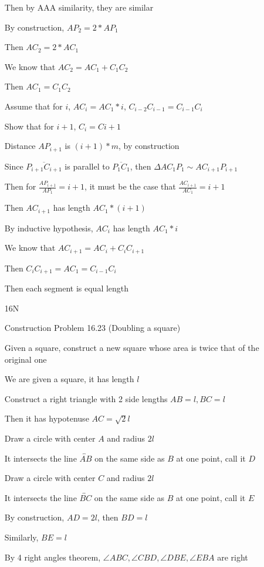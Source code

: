 \documentclass[11pt]{article}
\newcommand{\lines}[1]{\overleftrightarrow{#1}}
\newcommand{\segment}[1]{\overline{#1}}
\begin{document}
\begin{itemize}
		Then by AAA similarity, they are similar
			
		By construction, $AP_2 = 2*AP_1$

		Then $AC_2 = 2 * AC_1$

		We know that $AC_2 = AC_1 + C_1C_2$

		Then $AC_1 = C_1C_2$

		Assume that for $i$, $AC_i = AC_1 * i$,  $C_{i-2}C_{i-1} = C_{i-1}C_{i}$

		Show that for $i+1$, $C_{i} = C{i+1}$

		Distance $AP_{i+1}$ is $(i+1)*m$, by construction

		Since $\segment{P_{i+1}C_{i+1}}$ is parallel to $\segment{P_1C_1}$, then $\Delta AC_1P_1 \sim AC_{i+1}P_{i+1}$

		Then for $\frac{AP_{i+1}}{AP_{1}} = i+1$, it must be the case that $\frac{AC_{i+1}}{AC_1} = i+1$

		Then $AC_{i+1}$ has length $AC_1 * (i + 1)$

		By inductive hypothesis, $AC_i$ has length $AC_1 * i$

		We know that $AC_{i+1} = AC_i + C_iC_{i+1}$

		Then $C_iC_{i+1} = AC_1 = C_{i-1}C_{i}$

		Then each segment is equal length

	\item[16N]

		Construction Problem 16.23 (Doubling a square)

		Given a square, construct a new square whose area is twice that of the original one

		We are given a square, it has length $l$

		Construct a right triangle with 2 side lengths $AB = l, BC = l$

		Then it has hypotenuse $AC = \sqrt{2}l$

		Draw a circle with center $A$ and radius $2l$

		It intersects the line $\lines{AB}$ on the same side as $B$ at one point, call it $D$

		Draw a circle with center $C$ and radius $2l$

		It intersects the line $\lines{BC}$ on the same side as $B$ at one point, call it $E$

		By construction, $AD = 2l$, then $BD = l$

		Similarly, $BE = l$

		By 4 right angles theorem, $\angle ABC, \angle CBD, \angle DBE, \angle EBA$ are right


\end{itemize}
\end{document}
